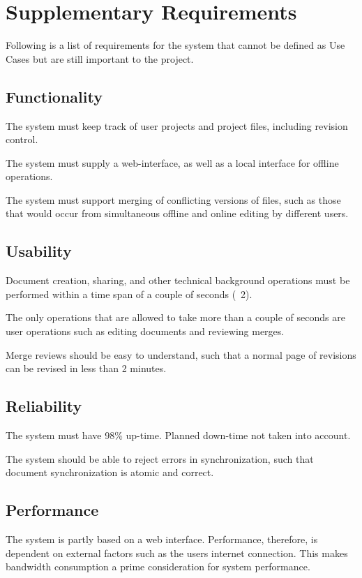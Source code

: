\section{Supplementary Requirements}
\label{sec:Supplementary Requirements}

Following is a list of requirements for the system that cannot be defined as Use Cases %
but are still important to the project.

\subsection{Functionality}
The system must keep track of user projects and project files, including revision control.

The system must supply a web-interface, as well as a local interface for offline operations.

The system must support merging of conflicting versions of files, such as those that would occur from simultaneous offline and online editing by different users.

\subsection{Usability}
Document creation, sharing, and other technical background operations must be performed within a time span of a couple of seconds (~2).

The only operations that are allowed to take more than a couple of seconds are user operations such as editing documents and reviewing merges.

Merge reviews should be easy to understand, such that a normal page of revisions can be revised in less than 2 minutes.

\subsection{Reliability}
The system must have 98\% up-time. Planned down-time not taken into account.

The system should be able to reject errors in synchronization, such that document synchronization is atomic and correct.

\subsection{Performance}
The system is partly based on a web interface. Performance, therefore, is dependent on external factors such as the users internet connection.
This makes bandwidth consumption a prime consideration for system performance.

